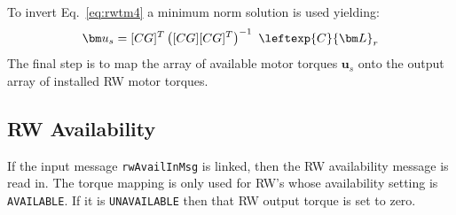 To invert Eq.~\eqref{eq:rwtm4} a minimum norm solution is used yielding:
\begin{equation}
 \bm u_{s}  = [CG]^T \left([CG][CG]^T\right)^{-1}\  \leftexp{C}{\bm L}_{r}
\end{equation}
The final step is to map the array of available motor torques $\bm u_{s}$ onto the output array of installed RW motor torques.


\subsection{RW Availability}
If the input message  {\tt rwAvailInMsg} is linked, then the RW availability message is read in. The torque mapping is only used for RW's whose availability setting is {\tt AVAILABLE}.  If it is {\tt UNAVAILABLE} then that RW output torque is set to zero.
